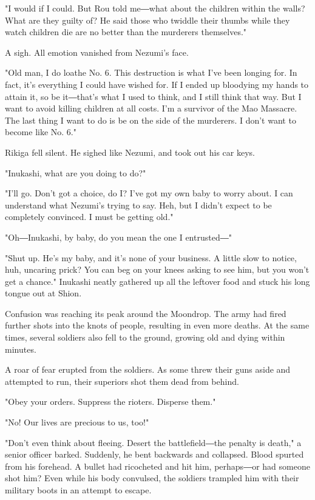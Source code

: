 "I would if I could. But Rou told me―what about the children within the
walls? What are they guilty of? He said those who twiddle their thumbs
while they watch children die are no better than the murderers
themselves."

A sigh. All emotion vanished from Nezumi's face.

"Old man, I do loathe No. 6. This destruction is what I've been longing
for. In fact, it's everything I could have wished for. If I ended up
bloodying my hands to attain it, so be it―that's what I used to think,
and I still think that way. But I want to avoid killing children at all
costs. I'm a survivor of the Mao Massacre. The last thing I want to do
is be on the side of the murderers. I don't want to become like No. 6."

Rikiga fell silent. He sighed like Nezumi, and took out his car keys.

"Inukashi, what are you doing to do?"

"I'll go. Don't got a choice, do I? I've got my own baby to worry about.
I can understand what Nezumi's trying to say. Heh, but I didn't expect
to be completely convinced. I must be getting old."

"Oh―Inukashi, by baby, do you mean the one I entrusted―"

"Shut up. He's my baby, and it's none of your business. A little slow to
notice, huh, uncaring prick? You can beg on your knees asking to see
him, but you won't get a chance." Inukashi neatly gathered up all the
leftover food and stuck his long tongue out at Shion.~

Confusion was reaching its peak around the Moondrop. The army had fired
further shots into the knots of people, resulting in even more deaths.
At the same times, several soldiers also fell to the ground, growing old
and dying within minutes.

A roar of fear erupted from the soldiers. As some threw their guns aside
and attempted to run, their superiors shot them dead from behind.

"Obey your orders. Suppress the rioters. Disperse them."

"No! Our lives are precious to us, too!"

"Don't even think about fleeing. Desert the battlefield―the penalty is
death," a senior officer barked. Suddenly, he bent backwards and
collapsed. Blood spurted from his forehead. A bullet had ricocheted and
hit him, perhaps―or had someone shot him? Even while his body convulsed,
the soldiers trampled him with their military boots in an attempt to
escape.

